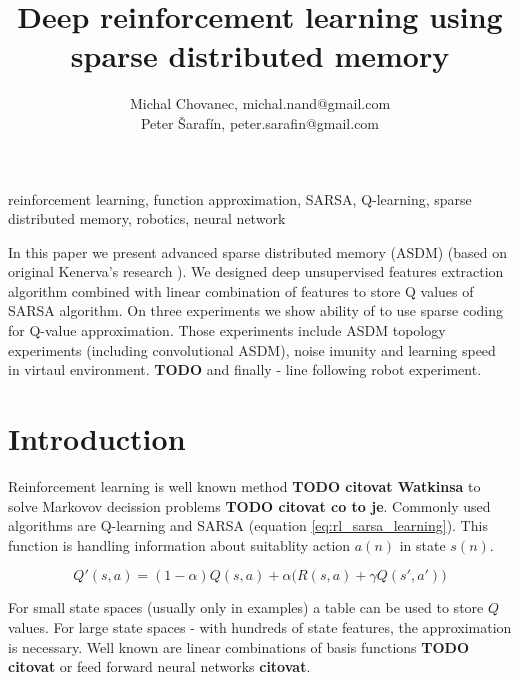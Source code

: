 \documentclass[10pt,a4paper]{article}
\begin{document}
\title{Deep reinforcement learning using sparse distributed memory}
\author{Michal Chovanec, michal.nand@gmail.com \\
Peter Šarafín, peter.sarafin@gmail.com}
\date{}
\maketitle
\thispagestyle{empty}


 reinforcement learning, function approximation, SARSA, Q-learning, sparse distributed memory, robotics, neural network

In this paper we present advanced sparse distributed memory (ASDM) (based on original Kenerva's research \cite{bib:sdm_01}\cite{bib:sdm_02}\cite{bib:sdm_03}).
We designed deep unsupervised features extraction algorithm combined with linear combination of features
to store Q values of SARSA algorithm.
On three experiments we show ability of to use sparse coding for Q-value approximation.
Those experiments include ASDM topology experiments (including convolutional ASDM), noise imunity
and learning speed in virtaul environment. {\bf TODO} and finally - line following robot experiment.

\section{Introduction}

Reinforcement learning is well known method {\bf TODO citovat Watkinsa} to solve Markovov decission problems {\bf TODO citovat co to je}.
Commonly used algorithms are Q-learning and SARSA (equation \ref{eq:rl_sarsa_learning}).
This function is handling information about suitablity action $a(n)$ in state $s(n)$.

\begin{equation}
  \label{eq:rl_sarsa_learning}
  Q'(s, a) = (1-\alpha)Q(s, a) + \alpha \Big(R(s, a) + \gamma Q(s', a') \Big)
\end{equation}

For small state spaces (usually only in examples) a table can be used to store $Q$ values.
For large state spaces - with hundreds of state features, the approximation is necessary.
Well known are linear combinations of basis functions {\bf TODO citovat} or feed forward neural networks {\bf citovat}.
\end{document}
